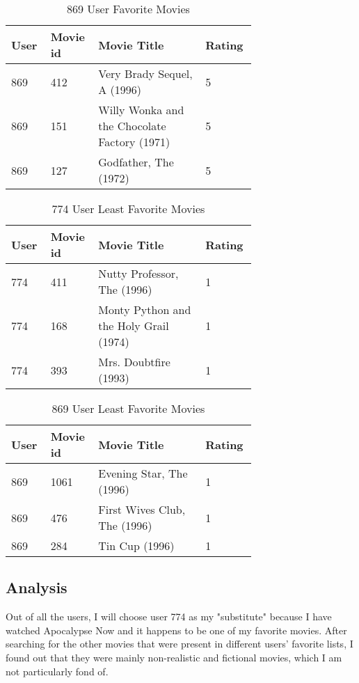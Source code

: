 \documentclass[12pt]{article}
\begin{document}
\begin{table}[h]
\centering
\caption{869 User Favorite Movies}
\label{tbl:simple}
\begin{tabular}{p{0.10\linewidth}p{0.10\linewidth}p{0.40\linewidth}p{0.10\linewidth}}
\hline
\textbf{User} & \textbf{Movie id} & \textbf{Movie Title} & \textbf{Rating} \\ \hline \hline
869 & 412 & Very Brady Sequel, A (1996) & 5 \\ \hline
869 & 151 & Willy Wonka and the Chocolate Factory (1971) & 5 \\ \hline
869 & 127 & Godfather, The (1972) & 5 \\ \hline
\hline
\end{tabular}
\end{table}

\begin{table}[h]
\centering
\caption{774 User Least Favorite Movies}
\label{tbl:simple}
\begin{tabular}{p{0.10\linewidth}p{0.10\linewidth}p{0.40\linewidth}p{0.10\linewidth}}
\hline
\textbf{User} & \textbf{Movie id} & \textbf{Movie Title} & \textbf{Rating} \\ \hline \hline
774 & 411 & Nutty Professor, The (1996) & 1 \\ \hline
774 & 168 & Monty Python and the Holy Grail (1974) & 1 \\ \hline
774 & 393 & Mrs. Doubtfire (1993) & 1 \\ \hline
\hline
\end{tabular}
\end{table}

\begin{table}[h]
\centering
\caption{869 User Least Favorite Movies}
\label{tbl:simple}
\begin{tabular}{p{0.10\linewidth}p{0.10\linewidth}p{0.40\linewidth}p{0.10\linewidth}}
\hline
\textbf{User} & \textbf{Movie id} & \textbf{Movie Title} & \textbf{Rating} \\ \hline \hline
869 & 1061 & Evening Star, The (1996) & 1 \\ \hline
869 & 476 & First Wives Club, The (1996) & 1 \\ \hline
869 & 284 & Tin Cup (1996) & 1 \\ \hline
\hline
\end{tabular}
\end{table}


\subsection*{Analysis}
Out of all the users, I will choose user 774 as my "substitute" because I have watched Apocalypse Now and it happens to be one of my favorite movies. After searching for the other movies that were present in different users' favorite lists, I found out that they were mainly non-realistic and fictional movies, which I am not particularly fond of. 
\end{document}
